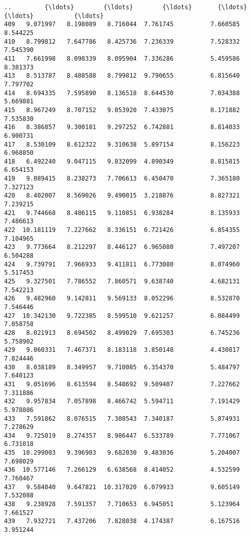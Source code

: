 \documentclass[11pt]{article}
\begin{document}
\begin{Verbatim}[commandchars=\\\{\}]
..         {\ldots}        {\ldots}        {\ldots}       {\ldots}               {\ldots}           {\ldots}
409   9.071997   8.198089   8.716044  7.761745          7.660585      8.544225
410   8.799812   7.647786   8.425736  7.236339          7.528332      7.545390
411   7.661998   8.098339   8.095904  7.336286          5.459586      8.381373
413   8.513787   8.488588   8.799812  9.790655          6.815640      7.797702
414   8.694335   7.595890   8.136518  8.644530          7.034388      5.669881
415   8.967249   8.707152   9.053920  7.433075          8.171882      7.535830
416   8.386857   9.300181   9.297252  6.742881          8.814033      6.900731
417   8.530109   8.612322   9.310638  5.897154          8.156223      6.968850
418   6.492240   9.047115   9.832099  4.890349          8.815815      6.654153
419   9.089415   8.238273   7.706613  6.450470          7.365180      7.327123
420   8.402007   8.569026   9.490015  3.218876          8.827321      7.239215
421   9.744668   8.486115   9.110851  6.938284          8.135933      7.486613
422  10.181119   7.227662   8.336151  6.721426          6.854355      7.104965
423   9.773664   8.212297   8.446127  6.965080          7.497207      6.504288
424   9.739791   7.966933   9.411811  6.773080          8.074960      5.517453
425   9.327501   7.786552   7.860571  9.638740          4.682131      7.542213
426   9.482960   9.142811   9.569133  8.052296          8.532870      7.546446
427  10.342130   9.722385   8.599510  9.621257          6.084499      7.058758
428   8.021913   8.694502   8.499029  7.695303          6.745236      5.758902
429   9.060331   7.467371   8.183118  3.850148          4.430817      7.824446
430   8.038189   8.349957   9.710085  6.354370          5.484797      7.640123
431   9.051696   8.613594   8.548692  9.509407          7.227662      7.311886
432   9.957834   7.057898   8.466742  5.594711          7.191429      5.978886
433   7.591862   8.076515   7.308543  7.340187          5.874931      7.278629
434   9.725019   8.274357   8.986447  6.533789          7.771067      6.731018
435  10.299003   9.396903   9.682030  9.483036          5.204007      7.698029
436  10.577146   7.266129   6.638568  8.414052          4.532599      7.760467
437   9.584040   9.647821  10.317020  6.079933          9.605149      7.532088
438   9.238928   7.591357   7.710653  6.945051          5.123964      7.661527
439   7.932721   7.437206   7.828038  4.174387          6.167516      3.951244


\end{Verbatim}
\end{document}
